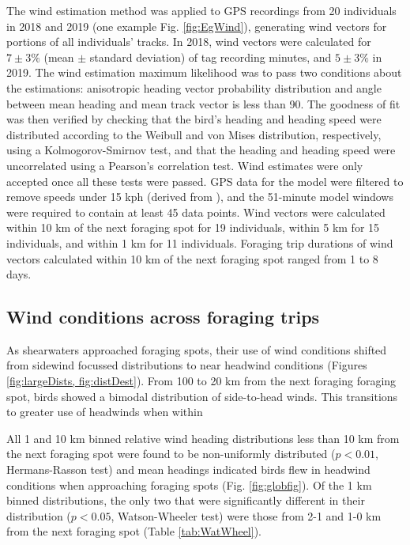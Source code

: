 \documentclass[9pt,twocolumn,twoside,lineno]{pnas-new}
\begin{document}
    The wind estimation method was applied to GPS recordings from 20 individuals in 2018 and 2019 (one example Fig. \ref{fig:EgWind}), generating wind vectors for portions of all individuals' tracks. In 2018, wind vectors were calculated for $7 \pm 3\%$ (mean $\pm$ standard deviation) of tag recording minutes, and $5 \pm 3\%$ in 2019. The wind estimation maximum likelihood was to pass two conditions about the estimations: anisotropic heading vector probability distribution and angle between mean heading and mean track vector is less than 90{\degree}. The goodness of fit was then verified by checking that the bird's heading and heading speed were distributed according to the Weibull and von Mises distribution, respectively, using a Kolmogorov-Smirnov test, and that the heading and heading speed were uncorrelated using a Pearson's correlation test. Wind estimates were only accepted once all these tests were passed. GPS data for the model were filtered to remove speeds under 15 kph (derived from \citep{Shiomi_2012}), and the 51-minute model windows were required to contain at least 45 data points. Wind vectors were calculated within 10 km of the next foraging spot for 19 individuals, within 5 km for 15 individuals, and within 1 km for 11 individuals. Foraging trip durations of wind vectors calculated within 10 km of the next foraging spot ranged from 1 to 8 days. 

\subsection{Wind conditions across foraging trips}
    As shearwaters approached foraging spots, their use of wind conditions shifted from sidewind focussed distributions to near headwind conditions (Figures \cref{fig:largeDists, fig:distDest}). From 100 to 20 km from the next foraging foraging spot, birds showed a bimodal distribution of side-to-head winds. This transitions to greater use of headwinds when within 

    All 1 and 10 km binned relative wind heading distributions less than 10 km from the next foraging spot were found to be non-uniformly distributed ($p < 0.01$, Hermans-Rasson test) and mean headings indicated birds flew in headwind conditions when approaching foraging spots (Fig. \ref{fig:globfig}). Of the 1 km binned distributions, the only two that were significantly different in their distribution ($p < 0.05$, Watson-Wheeler test) were those from 2-1 and 1-0 km from the next foraging spot (Table \ref{tab:WatWheel}).
\end{document}
